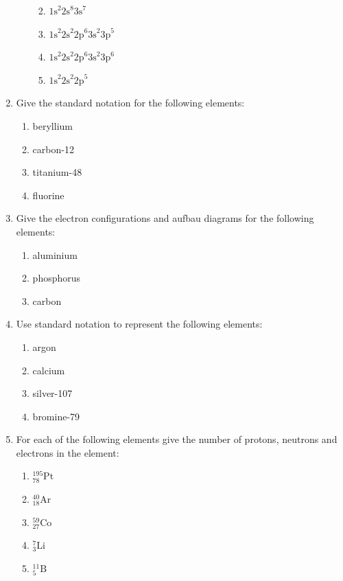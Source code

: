 \begin{enumerate}[noitemsep, label=\textbf{\arabic*}. ]
\begin{enumerate}[noitemsep, label=\textbf{\alph*}. ]
\begin{enumerate}[noitemsep, label=\textbf{\alph*}. ]
            \label{m38741*uid218}\item  ${1\mathrm{s}}^{2}{2\mathrm{s}}^{8}{3\mathrm{s}}^{7}$\label{m38741*uid219}\item 
${1\mathrm{s}}^{2}{2\mathrm{s}}^{2}{2\mathrm{p}}^{6}{3\mathrm{s}}^{2}{3\mathrm{p}}^{5}$
\label{m38741*uid220}\item 
${1\mathrm{s}}^{2}{2\mathrm{s}}^{2}{2\mathrm{p}}^{6}{3\mathrm{s}}^{2}{3\mathrm{p}}^{6}$\label{m38741*uid221}\item 
${1\mathrm{s}}^{2}{2\mathrm{s}}^{2}{2\mathrm{p}}^{5}$\end{enumerate}
                \end{enumerate}
        \item Give the standard notation for the following elements:
\label{m38741*id8223}\begin{enumerate}[noitemsep, label=\textbf{\alph*}. ] 
            \item beryllium\item carbon-12\item titanium-48\item fluorine\end{enumerate}
\item Give the electron configurations and aufbau diagrams for the following elements:\label{m38741*id7624}\begin{enumerate}[noitemsep, label=\textbf{\alph*}. ] 
            \item aluminium\item phosphorus\item carbon\end{enumerate}
\item Use standard notation to represent the following elements: \label{m38741*id74324}\begin{enumerate}[noitemsep, label=\textbf{\alph*}. ] 
            \item argon\item calcium\item silver-107\item bromine-79\end{enumerate}
\item For each of the following elements give the number of protons, neutrons and electrons in the element: \label{m38741*id74374}\begin{enumerate}[noitemsep, label=\textbf{\alph*}. ] 
            \item $_{78}^{195}\mathrm{Pt}$\item $_{18}^{40}\mathrm{Ar}$\item $_{27}^{59}\mathrm{Co}$\item $_{3}^{7}\mathrm{Li}$\item $_{5}^{11}\mathrm{B}$\end{enumerate}

\end{enumerate}
